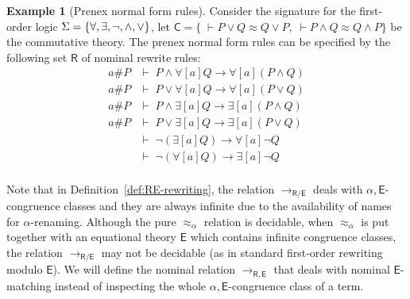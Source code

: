 \documentclass[11pt,a4paper]{amsart}
\newcommand{\aleq}{\approx_{\alpha}}
\newcommand{\theory}[1]{\ensuremath{\mathsf{#1}}}
\theoremstyle{plain}
\theoremstyle{definition}
\newtheorem{example}{Example}[section]
\theoremstyle{remark}
\newtheorem{remark}[theorem]{Remark}
\begin{document}
\begin{example}[Prenex normal form rules]\label{ex:prenex-rules}
    Consider the signature for the first-order logic $\Sigma = \{\forall, \exists, \lnot, \land,\linebreak
    \lor \}$, let $\theory{C} = \{\;\vdash P \lor Q \approx Q \lor P, \;\vdash P \land Q \approx Q \land P\}$ be the commutative theory. The prenex normal form rules can be specified by the following set $\theory{R}$ of nominal rewrite rules:
\[
\begin{array}{rl}
    a \# P & \vdash \; P \land \forall[a]Q \rightarrow \forall [a](P \land Q)\\
    a \# P & \vdash \; P \lor \forall[a] Q \rightarrow \forall[a] (P \lor Q)\\
    a \# P & \vdash \; P \land \exists[a]Q \rightarrow \exists[a](P \land Q)\\
    a \# P & \vdash \; P \lor \exists[a]Q \rightarrow \exists[a](P \lor Q)\\
    & \vdash \; \lnot (\exists[a]Q) \rightarrow \forall[a] \lnot Q\\
    & \vdash \; \lnot (\forall[a]Q) \rightarrow \exists[a] \lnot Q\\
\end{array}
\]

\end{example}

Note that in Definition~\ref{def:RE-rewriting}, the relation $\to_\theory{R/E}$ deals with $\alpha,\theory{E}$-congruence classes and they are always infinite due to the availability of names for $\alpha$-renaming. Although  the pure $\approx_\alpha$ relation is decidable,
when $\aleq$ is put together with an equational theory $\theory{E}$ which contains infinite congruence classes, the relation $\to_{\theory{R/E}}$ may not be decidable (as in standard first-order rewriting modulo $\theory{E}$).  We will define the nominal relation  $\to_{\theory{R,E}}$ that deals with nominal $\theory{E}$-matching instead of inspecting the whole $\alpha,\theory{E}$-congruence class of a term. 
\end{document}
